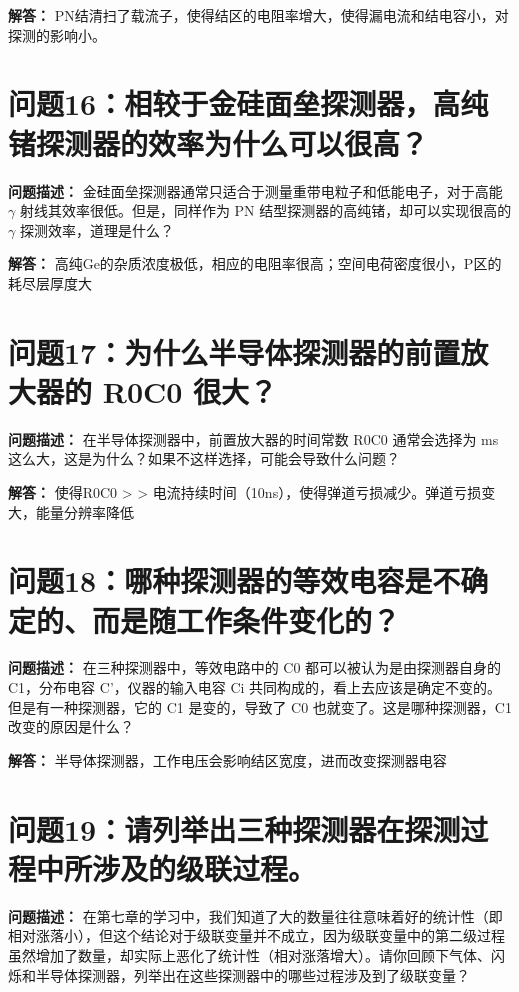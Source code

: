 \documentclass{article}
\begin{document}
\textbf{解答：} PN结清扫了载流子，使得结区的电阻率增大，使得漏电流和结电容小，对探测的影响小。

\section{问题16：相较于金硅面垒探测器，高纯锗探测器的效率为什么可以很高？}
\label{sec:prob16}

\textbf{问题描述：} 金硅面垒探测器通常只适合于测量重带电粒子和低能电子，对于高能 $\gamma$ 射线其效率很低。但是，同样作为 PN 结型探测器的高纯锗，却可以实现很高的 $\gamma$ 探测效率，道理是什么？

\textbf{解答：} 高纯Ge的杂质浓度极低，相应的电阻率很高；空间电荷密度很小，P区的耗尽层厚度大

\section{问题17：为什么半导体探测器的前置放大器的 R0C0 很大？}
\label{sec:prob17}

\textbf{问题描述：} 在半导体探测器中，前置放大器的时间常数 R0C0 通常会选择为 ms 这么大，这是为什么？如果不这样选择，可能会导致什么问题？

\textbf{解答：} 使得R0C0 > > 电流持续时间（10ns），使得弹道亏损减少。弹道亏损变大，能量分辨率降低

\section{问题18：哪种探测器的等效电容是不确定的、而是随工作条件变化的？}
\label{sec:prob18}

\textbf{问题描述：} 在三种探测器中，等效电路中的 C0 都可以被认为是由探测器自身的 C1，分布电容 C'，仪器的输入电容 Ci 共同构成的，看上去应该是确定不变的。但是有一种探测器，它的 C1 是变的，导致了 C0 也就变了。这是哪种探测器，C1 改变的原因是什么？

\textbf{解答：} 半导体探测器，工作电压会影响结区宽度，进而改变探测器电容

\section{问题19：请列举出三种探测器在探测过程中所涉及的级联过程。}
\label{sec:prob19}

\textbf{问题描述：} 在第七章的学习中，我们知道了大的数量往往意味着好的统计性（即相对涨落小），但这个结论对于级联变量并不成立，因为级联变量中的第二级过程虽然增加了数量，却实际上恶化了统计性（相对涨落增大）。请你回顾下气体、闪烁和半导体探测器，列举出在这些探测器中的哪些过程涉及到了级联变量？
\end{document}
